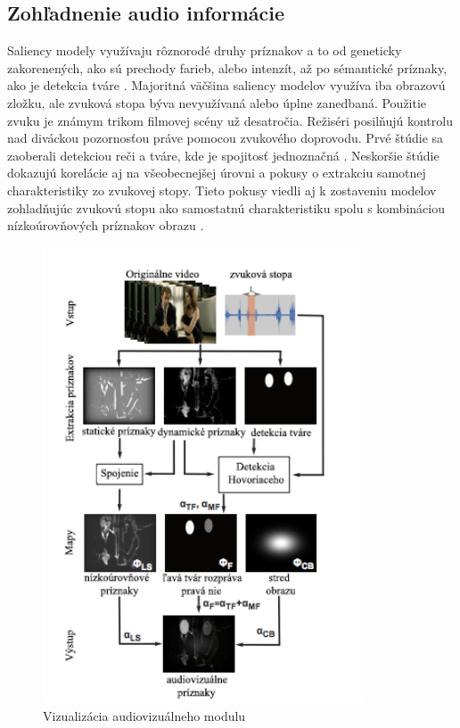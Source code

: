 \subsection{Zohľadnenie audio informácie}
Saliency modely využívaju rôznorodé druhy príznakov a to od geneticky zakorenených, ako sú prechody farieb, alebo intenzít, až po sémantické príznaky, ako je detekcia tváre \cite{salient-faces}.
Majoritná väčšina saliency modelov využíva iba obrazovú zložku, ale zvuková stopa býva nevyužívaná alebo úplne zanedbaná.
Použitie zvuku je známym trikom filmovej scény už desatročia.
Režiséri posilňujú kontrolu nad diváckou pozornosťou práve pomocou zvukového doprovodu.
Prvé štúdie sa zaoberali detekciou reči a tváre, kde je spojitosť jednoznačná \cite{sound-1}.
Neskoršie štúdie dokazujú korelácie aj na všeobecnejšej úrovni a pokusy o extrakciu samotnej charakteristiky zo zvukovej stopy\cite{sound-coutrot-1}.
Tieto pokusy viedli aj k zostaveniu modelov zohladňujúc zvukovú stopu ako samostatnú charakteristiku spolu s kombináciou nízkoúrovňových príznakov obrazu \cite{sound-courot-2}.

\begin{figure}[H]
  \centering
  \includegraphics[width=9.5cm]{pics/courot-1.png}
  \caption{Vizualizácia audiovizuálneho modulu\cite{sound-courot-2}}\label{wrap-fig:4}
\end{figure}
\vspace{10mm}

